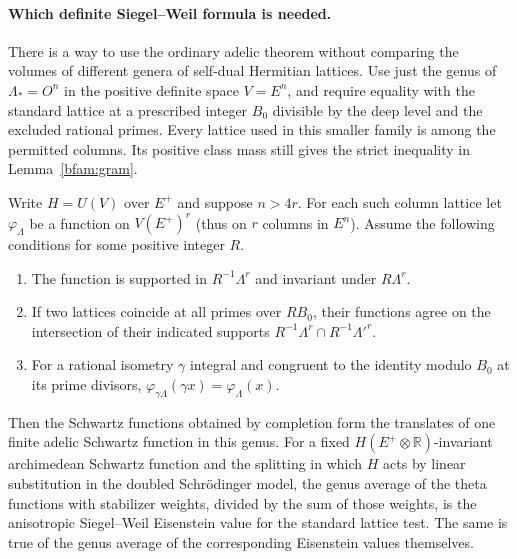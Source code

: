 \paragraph{Which definite Siegel--Weil formula is needed.}
There is a way to use the ordinary adelic theorem without comparing
the volumes of different genera of self-dual Hermitian lattices.
Use just the genus of \(\Lambda_*=O^n\) in the positive definite
space \(V=E^n\), and require equality with the standard lattice
at a prescribed integer \(B_0\) divisible by the deep level and
the excluded rational primes. Every lattice used in this smaller
family is among the permitted columns. Its positive class mass
still gives the strict inequality in Lemma~\ref{bfam:gram}.

\begin{lemma}\label{bfam:genus}
Write \(H=U(V)\) over \(E^+\) and suppose \(n>4r\).
For each such column lattice let
\(\varphi_\Lambda\) be a function on \(V(E^+)^r\) (thus on
\(r\) columns in \(E^n\)). Assume the following conditions for
some positive integer \(R\).
\begin{enumerate}
\item The function is supported in \(R^{-1}\Lambda^r\) and
invariant under \(R\Lambda^r\).
\item If two lattices coincide at all primes over \(RB_0\),
their functions agree on the intersection of their indicated
supports \(R^{-1}\Lambda^r\cap R^{-1}\Lambda'^r\).
\item For a rational isometry \(\gamma\) integral and congruent
to the identity modulo \(B_0\) at its prime divisors,
\(\varphi_{\gamma\Lambda}(\gamma x)=\varphi_\Lambda(x)\).
\end{enumerate}
Then the Schwartz functions obtained by completion form the
translates of one finite adelic Schwartz function in this genus.
For a fixed \(H(E^+\otimes\mathbb R)\)-invariant archimedean
Schwartz function and the splitting in which \(H\) acts by
linear substitution in the doubled Schrödinger model, the
genus average of the theta functions with stabilizer weights,
divided by the sum of those weights, is the anisotropic
Siegel--Weil Eisenstein value for the standard lattice test.
The same is true of the genus average of the corresponding
Eisenstein values themselves.
\end{lemma}
